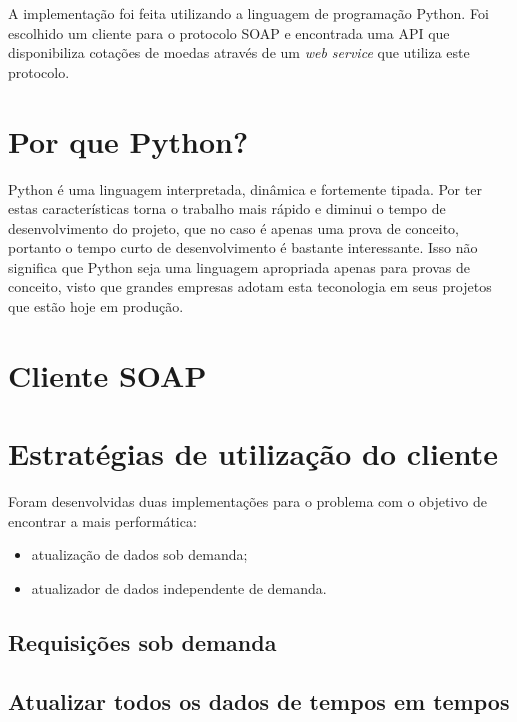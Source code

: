 \label{Cap:implementacao}

A implementação foi feita utilizando a linguagem de programação Python. Foi escolhido um cliente para o protocolo SOAP e encontrada uma API que disponibiliza cotações de moedas através de um \textit{web service} que utiliza este protocolo.

\section{Por que Python?}

Python é uma linguagem interpretada, dinâmica e fortemente tipada. Por ter estas características torna o trabalho mais rápido e diminui o tempo de desenvolvimento do projeto, que no caso é apenas uma prova de conceito, portanto o tempo curto de desenvolvimento é bastante interessante. Isso não significa que Python seja uma linguagem apropriada apenas para provas de conceito, visto que grandes empresas adotam esta teconologia em seus projetos que estão hoje em produção.

\section{Cliente SOAP}

\section{Estratégias de utilização do cliente}

Foram desenvolvidas duas implementações para o problema com o objetivo de encontrar a mais performática:

\begin{itemize}
\item atualização de dados sob demanda;
\item atualizador de dados independente de demanda.
\end{itemize}

\subsection{Requisições sob demanda}



\subsection{Atualizar todos os dados de tempos em tempos}

